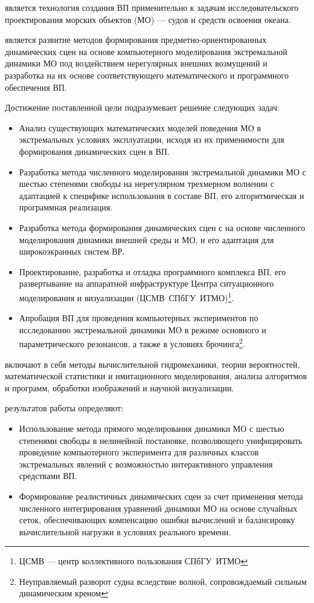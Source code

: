  является технология создания ВП применительно к задачам исследовательского проектирования морских объектов (МО) — судов и средств освоения океана.

 является развитие методов формирования предметно-ориентированных динамических сцен на основе компьютерного моделирования экстремальной динамики МО под воздействием нерегулярных внешних возмущений и разработка на их основе соответствующего математического и программного обеспечения ВП.

 Достижение поставленной цели подразумевает решение следующих задач:
\begin{itemize}
\item Анализ существующих математических моделей поведения МО в экстремальных условиях эксплуатации, исходя из их применимости для формирования динамических сцен в ВП.
\item Разработка метода численного моделирования экстремальной динамики МО с шестью степенями свободы на нерегулярном трехмерном волнении с адаптацией к специфике использования в составе ВП, его алгоритмическая и программная реализация.
\item Разработка метода формирования динамических сцен с на основе численного моделирования динамики внешней среды и МО, и его адаптация для широкоэкранных систем ВР.  
\item Проектирование, разработка и отладка программного комплекса ВП, его развертывание на аппаратной инфраструктуре Центра ситуационного моделирования и визуализации (\mbox{ЦСМВ~СПбГУ~ИТМО})\footnote{ЦСМВ --- центр коллективного пользования СПбГУ~ИТМО}.
\item Апробация ВП для проведения компьютерных экспериментов по исследованию экстремальной динамики МО в режиме основного и параметрического резонансов, а также в условиях брочинга\footnote{Неуправляемый разворот судна вследствие  волной, сопровождаемый сильным динамическим креном}. 
\end{itemize}

 включают в себя методы вычислительной гидромеханики, теории вероятностей, математической статистики и имитационного моделирования, анализа алгоритмов и программ, обработки изображений и научной визуализации.


 результатов работы определяют:
\begin{itemize}
	\item	Использование метода прямого моделирования динамики МО с шестью степенями свободы в нелинейной постановке, позволяющего унифицировать проведение компьютерного эксперимента для различных классов экстремальных явлений с возможностью интерактивного управления средствами ВП.
	\item	Формирование реалистичных динамических сцен за счет применения метода численного интегрирования уравнений динамики МО на основе случайных сеток, обеспечивающих компенсацию ошибки вычислений и балансировку вычислительной нагрузки в условиях реального времени.
\end{itemize}


